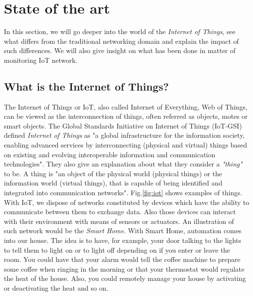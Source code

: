 \chapter{State of the art} \label{ch:state_art}

In this section, we will go deeper into the world of the \textit{Internet of Things}, see what differs from the traditional networking domain and explain the impact of such differences. We will also give insight on what has been done in matter of monitoring IoT network.\\

\section{What is the Internet of Things?}

The Internet of Things or IoT, also called Internet of Everything, Web of Things, can be viewed as the interconnection of things, often referred as objects, motes or smart objects. The Global Standards Initiative on Internet of Things (IoT-GSI) defined \textit{Internet of Things} as "a global infrastructure for the information society, enabling advanced services by interconnecting (physical and virtual) things based on existing and evolving interoperable information and communication technologies"\cite{ituitu}. They also give an explanation about what they consider a \textit{"thing"} to be. A thing is "an object of the physical world (physical things) or the information world (virtual things), that is capable of being identified and integrated into communication networks"\cite{ituitu}. Fig.\ref{fig:iot} shows examples of things.\\

With IoT, we dispose of networks constituted by devices which have the ability to communicate between them to exchange data. Also those devices can interact with their environment with means of sensors or actuators. An illustration of such network would be the \textit{Smart Home}. With Smart Home, automation comes into our house. The idea is to have, for example, your door talking to the lights to tell them to light on or to light off depending on if you enter or leave the room. You could have that your alarm would tell the coffee machine to prepare some coffee when ringing in the morning or that your thermostat would regulate the heat of the house. Also, you could remotely manage your house by activating or deactivating the heat and so on. \\

